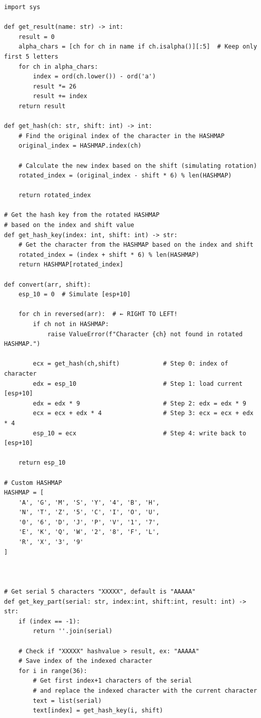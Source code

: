 \begin{lstlisting}
import sys

def get_result(name: str) -> int:
    result = 0
    alpha_chars = [ch for ch in name if ch.isalpha()][:5]  # Keep only first 5 letters
    for ch in alpha_chars:
        index = ord(ch.lower()) - ord('a')
        result *= 26
        result += index
    return result

def get_hash(ch: str, shift: int) -> int:
    # Find the original index of the character in the HASHMAP
    original_index = HASHMAP.index(ch)

    # Calculate the new index based on the shift (simulating rotation)
    rotated_index = (original_index - shift * 6) % len(HASHMAP)
    
    return rotated_index

# Get the hash key from the rotated HASHMAP
# based on the index and shift value
def get_hash_key(index: int, shift: int) -> str:
    # Get the character from the HASHMAP based on the index and shift
    rotated_index = (index + shift * 6) % len(HASHMAP)
    return HASHMAP[rotated_index]

def convert(arr, shift):
    esp_10 = 0  # Simulate [esp+10]
    
    for ch in reversed(arr):  # ← RIGHT TO LEFT!
        if ch not in HASHMAP:
            raise ValueError(f"Character {ch} not found in rotated HASHMAP.")

        ecx = get_hash(ch,shift)            # Step 0: index of character
        edx = esp_10                        # Step 1: load current [esp+10]
        edx = edx * 9                       # Step 2: edx = edx * 9
        ecx = ecx + edx * 4                 # Step 3: ecx = ecx + edx * 4
        esp_10 = ecx                        # Step 4: write back to [esp+10]

    return esp_10

# Custom HASHMAP
HASHMAP = [
    'A', 'G', 'M', 'S', 'Y', '4', 'B', 'H',
    'N', 'T', 'Z', '5', 'C', 'I', 'O', 'U',
    '0', '6', 'D', 'J', 'P', 'V', '1', '7',
    'E', 'K', 'Q', 'W', '2', '8', 'F', 'L',
    'R', 'X', '3', '9'
]



# Get serial 5 characters "XXXXX", default is "AAAAA"
def get_key_part(serial: str, index:int, shift:int, result: int) -> str:
    if (index == -1):
        return ''.join(serial)

    # Check if "XXXXX" hashvalue > result, ex: "AAAAA"
    # Save index of the indexed character
    for i in range(36):
        # Get first index+1 characters of the serial
        # and replace the indexed character with the current character
        text = list(serial)
        text[index] = get_hash_key(i, shift)
        

\end{lstlisting}
